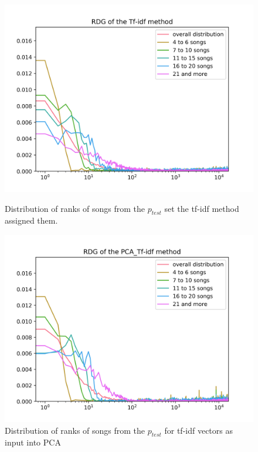 \begin{figure}[h]
\centering
\begin{minipage}{.45\textwidth}
  \centering
  \includegraphics[width=1\linewidth]{./img/tf_idf_graph.png}
  \caption{Distribution of ranks of songs from the $ p_{test}$  set the tf-idf method assigned them.}
  \label{fig:tf_idf_distribution}
\end{minipage}%
 \vspace{1cm}
\begin{minipage}{.45\textwidth}
  \centering
  \includegraphics[width=1\linewidth]{./img/pca_tf_idf_graph.png}
  \caption{Distribution of ranks of songs from the $ p_{test} $ for tf-idf vectors as input into PCA}
  \label{fig:pca_tf_idf_distribution}
\end{minipage}
\end{figure}

